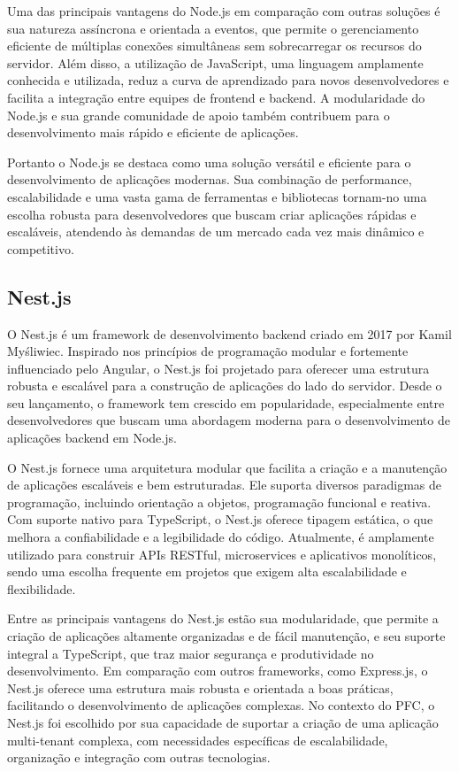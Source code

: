 Uma das principais vantagens do Node.js em comparação com outras soluções é sua natureza assíncrona e orientada a eventos, que permite o gerenciamento eficiente de múltiplas conexões simultâneas sem sobrecarregar os recursos do servidor. Além disso, a utilização de JavaScript, uma linguagem amplamente conhecida e utilizada, reduz a curva de aprendizado para novos desenvolvedores e facilita a integração entre equipes de frontend e backend. A modularidade do Node.js e sua grande comunidade de apoio também contribuem para o desenvolvimento mais rápido e eficiente de aplicações.

Portanto o Node.js se destaca como uma solução versátil e eficiente para o desenvolvimento de aplicações modernas. Sua combinação de performance, escalabilidade e uma vasta gama de ferramentas e bibliotecas tornam-no uma escolha robusta para desenvolvedores que buscam criar aplicações rápidas e escaláveis, atendendo às demandas de um mercado cada vez mais dinâmico e competitivo.

\subsection{Nest.js}

O Nest.js é um framework de desenvolvimento backend criado em 2017 por Kamil Myśliwiec. Inspirado nos princípios de programação modular e fortemente influenciado pelo Angular, o Nest.js foi projetado para oferecer uma estrutura robusta e escalável para a construção de aplicações do lado do servidor. Desde o seu lançamento, o framework tem crescido em popularidade, especialmente entre desenvolvedores que buscam uma abordagem moderna para o desenvolvimento de aplicações backend em Node.js.

O Nest.js fornece uma arquitetura modular que facilita a criação e a manutenção de aplicações escaláveis e bem estruturadas. Ele suporta diversos paradigmas de programação, incluindo orientação a objetos, programação funcional e reativa. Com suporte nativo para TypeScript, o Nest.js oferece tipagem estática, o que melhora a confiabilidade e a legibilidade do código. Atualmente, é amplamente utilizado para construir APIs RESTful, microservices e aplicativos monolíticos, sendo uma escolha frequente em projetos que exigem alta escalabilidade e flexibilidade.

Entre as principais vantagens do Nest.js estão sua modularidade, que permite a criação de aplicações altamente organizadas e de fácil manutenção, e seu suporte integral a TypeScript, que traz maior segurança e produtividade no desenvolvimento. Em comparação com outros frameworks, como Express.js, o Nest.js oferece uma estrutura mais robusta e orientada a boas práticas, facilitando o desenvolvimento de aplicações complexas. No contexto do \acrlong{PFC}, o Nest.js foi escolhido por sua capacidade de suportar a criação de uma aplicação multi-tenant complexa, com necessidades específicas de escalabilidade, organização e integração com outras tecnologias.


